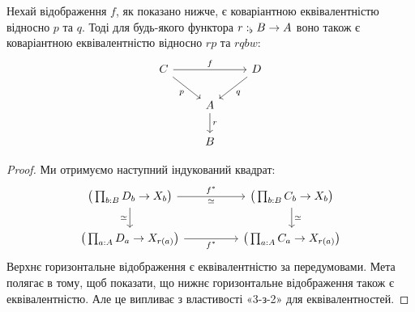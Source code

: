 \documentclass[12pt]{article}
\newcommand{\GM}{\flat}
\begin{document}
\begin{lem}\label{lem:cov-eq-comp}
  Нехай відображення $f$, як показано нижче, є коваріантною еквівалентністю відносно $p$ та $q$. Тоді для будь-якого функтора $\DeclVar{r}{\GM}{B \to A}$ воно також є коваріантною еквівалентністю відносно $rp$ та $rqbw$:
  \[
    \begin{tikzcd}
      C && D \\
      & A \\
      & B
      \arrow["f", from=1-1, to=1-3]
      \arrow["p"', from=1-1, to=2-2]
      \arrow["q", from=1-3, to=2-2]
      \arrow["r", from=2-2, to=3-2]
    \end{tikzcd}
  \]
\end{lem}

\begin{proof}
  Ми отримуємо наступний індукований квадрат:
  \[
    \begin{tikzcd}
      {\big( \prod_{b:B} D_b \to X_b \big)} && {\big( \prod_{b:B} C_b \to X_b \big)} \\
      {\big( \prod_{a:A} D_a \to X_{r(a)} \big)} && {\big( \prod_{a:A} C_a \to X_{r(a)} \big)}
      \arrow["{f^*}", "\simeq"', from=1-1, to=1-3]
      \arrow["\simeq"', from=1-1, to=2-1]
      \arrow["\simeq", from=1-3, to=2-3]
      \arrow["{f^*}"', from=2-1, to=2-3]
    \end{tikzcd}
  \]
  Верхнє горизонтальне відображення є еквівалентністю за передумовами. Мета полягає в тому, щоб показати, що нижнє горизонтальне відображення також є еквівалентністю. Але це випливає з властивості «3-з-2» для еквівалентностей.
\end{proof}
\end{document}
